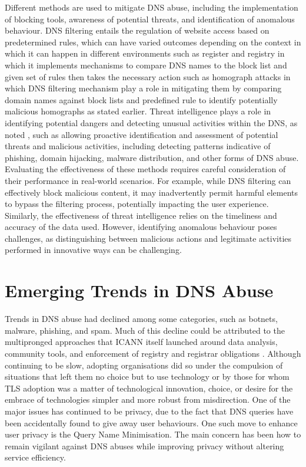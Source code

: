Different methods are used to mitigate DNS abuse, including the implementation of blocking tools, awareness of potential threats, and identification of anomalous behaviour. DNS filtering entails the regulation of website access based on predetermined rules, which can have varied outcomes depending on the context in which it can happen in different environments such as register and registry in which it implements mechanisms to compare DNS names to the block list and given set of rules then takes the necessary action such as homograph attacks in which DNS filtering mechanism play a role in mitigating them by comparing domain names against block lists and predefined rule to identify potentially malicious homographs as stated earlier. Threat intelligence plays a role in identifying potential dangers and detecting unusual activities within the DNS, as noted \cite{rizvi2022application}, such as allowing proactive identification and assessment of potential threats and malicious activities, including detecting patterns indicative of phishing, domain hijacking, malware distribution, and other forms of DNS abuse. Evaluating the effectiveness of these methods requires careful consideration of their performance in real-world scenarios. For example, while DNS filtering can effectively block malicious content, it may inadvertently permit harmful elements to bypass the filtering process, potentially impacting the user experience. Similarly, the effectiveness of threat intelligence relies on the timeliness and accuracy of the data used. However, identifying anomalous behaviour poses challenges, as distinguishing between malicious actions and legitimate activities performed in innovative ways can be challenging.


\section{Emerging Trends in DNS Abuse}

Trends in DNS abuse had declined among some categories, such as botnets, malware, phishing, and spam. Much of this decline could be attributed to the multipronged approaches that ICANN itself launched around data analysis, community tools, and enforcement of registry and registrar obligations \cite{icann_dns_security_threat}. Although continuing to be slow, adopting organisations did so under the compulsion of situations that left them no choice but to use technology or by those for whom TLS adoption was a matter of technological innovation, choice, or desire for the embrace of technologies simpler and more robust from misdirection. One of the major issues has continued to be privacy, due to the fact that DNS queries have been accidentally found to give away user behaviours. One such move to enhance user privacy is the Query Name Minimisation. The main concern has been how to remain vigilant against DNS abuses while improving privacy without altering service efficiency.

